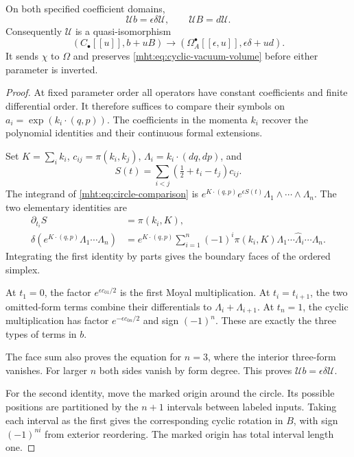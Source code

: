 \begin{theorem}\label{mht:thm:integral-cyclic-comparison}
On both specified coefficient domains,
\[
 \mathcal U b=\epsilon\delta\mathcal U,\qquad
 \mathcal U B=d\mathcal U.
\]
Consequently $\mathcal U$ is a quasi-isomorphism
\[
 (C_\bullet[[u]],b+uB)
 \longrightarrow
 (\Omega_A^\bullet[[\epsilon,u]],\epsilon\delta+ud).
\]
It sends $\chi$ to $\Omega$ and preserves
\eqref{mht:eq:cyclic-vacuum-volume} before either parameter
is inverted.
\end{theorem}
\begin{proof}
At fixed parameter order all operators have constant
coefficients and finite differential order. It therefore
suffices to compare their symbols on
$a_i=\exp(k_i\cdot(q,p))$.
The coefficients in the momenta $k_i$ recover the polynomial
identities and their continuous formal extensions.

Set $K=\sum_i k_i$, $c_{ij}=\pi(k_i,k_j)$,
$\Lambda_i=k_i\cdot(dq,dp)$, and
\[
 S(t)=\sum_{i<j}(\tfrac12+t_i-t_j)c_{ij}.
\]
The integrand of \eqref{mht:eq:circle-comparison} is
$e^{K\cdot(q,p)}e^{\epsilon S(t)}
\Lambda_1\wedge\cdots\wedge\Lambda_n$.
The two elementary identities are
\begin{align*}
 \partial_{t_i}S&=\pi(k_i,K),\\
 \delta(e^{K\cdot(q,p)}\Lambda_1\cdots\Lambda_n)
 &=e^{K\cdot(q,p)}\sum_{i=1}^n(-1)^i\pi(k_i,K)
         \Lambda_1\cdots\widehat\Lambda_i\cdots\Lambda_n.
\end{align*}
Integrating the first identity by parts gives the boundary
faces of the ordered simplex.

At $t_1=0$, the factor $e^{\epsilon c_{01}/2}$ is the first
Moyal multiplication. At $t_i=t_{i+1}$, the two omitted-form
terms combine their differentials to
$\Lambda_i+\Lambda_{i+1}$. At $t_n=1$, the cyclic
multiplication has factor $e^{-\epsilon c_{0n}/2}$ and sign
$(-1)^n$. These are exactly the three types of terms in $b$.

The face sum also proves the equation for $n=3$, where the
interior three-form vanishes. For larger $n$ both sides vanish
by form degree. This proves $\mathcal U b=\epsilon\delta\mathcal U$.

For the second identity, move the marked origin around the
circle. Its possible positions are partitioned by the $n+1$
intervals between labeled inputs. Taking each interval as
the first gives the corresponding cyclic rotation in $B$,
with sign $(-1)^{ni}$ from exterior reordering.
The marked origin has total interval length one.


\end{proof}
